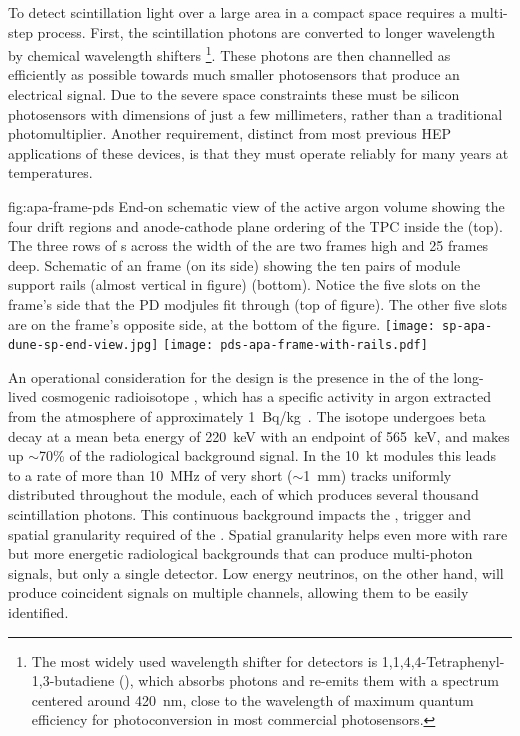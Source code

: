 To detect scintillation light over a large area in a compact space requires a multi-step process.  First, the  scintillation photons are converted to longer wavelength by chemical wavelength shifters
\footnote{The most widely used wavelength shifter for \lar detectors is  1,1,4,4-Tetraphenyl-1,3-butadiene (), 
which absorbs  photons and re-emits them with a spectrum centered around \SI{420}{nm}, close to the wavelength of maximum quantum efficiency for photoconversion in most commercial photosensors.}.
These photons are then channelled as efficiently as possible towards much smaller photosensors that produce an electrical signal. Due to the severe space constraints these must be silicon photosensors with dimensions of just a few millimeters,  rather than a traditional photomultiplier.
Another requirement, distinct from most previous HEP applications of these devices, is that they must operate reliably for many years at \lar temperatures. 

\begin{dunefigure}{fig:apa-frame-pds}
{End-on schematic view of the active argon volume showing the four drift regions and anode-cathode plane ordering of the TPC inside the  (top). The three rows of s across the width of the  are two frames high and 25 frames deep. Schematic of an  frame (on its side) showing the ten pairs of  module support rails (almost vertical in figure) (bottom). Notice the five slots on the frame's side that the PD modjules fit through (top of figure). The other five slots are on the frame's opposite side, at the bottom of the figure.}
\texttt{[image: sp-apa-dune-sp-end-view.jpg]}
\texttt{[image: pds-apa-frame-with-rails.pdf]}
\end{dunefigure}

An operational consideration for the  design is the presence in the \lartpc of the long-lived cosmogenic radioisotope , which has a specific activity in argon extracted from the atmosphere of approximately \SI{1}{Bq/kg}~\cite{bkds}. The isotope undergoes beta decay at a mean beta energy of \SI{220}{keV} with an endpoint of \SI{565}{keV}, and makes up $\sim$70\% of the radiological background signal.
In the \SI{10}{kt}  modules this leads to a rate of more than \SI{10}{MHz} of very short ($\sim$\SI{1}{mm}) tracks uniformly distributed throughout the module, each of which produces several thousand  scintillation photons. This continuous background impacts the , trigger and spatial granularity required of the . Spatial granularity helps even more with rare but more energetic radiological backgrounds that can produce multi-photon signals, but only a single detector. Low energy neutrinos, on the other hand, will produce coincident  signals on multiple channels, allowing them to be easily identified.

